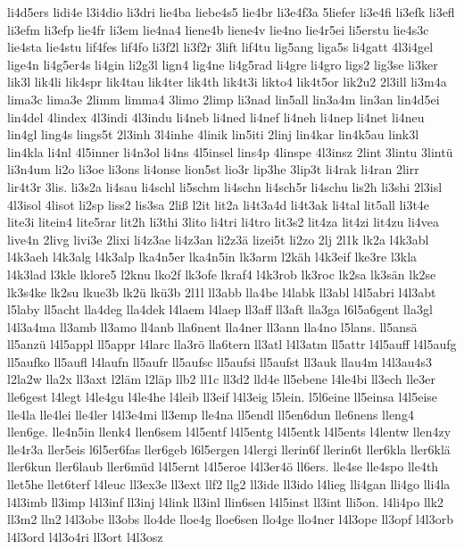 {li4d5ers
lidi4e
l3i4dio
li3dri
lie4ba
liebe4s5
lie4br
li3e4f3a
5liefer
li3e4fi
li3efk
li3efl
li3efm
li3efp
lie4fr
li3em
lie4na4
liene4b
liene4v
lie4no
lie4r5ei
li5erstu
lie4s3c
lie4sta
lie4stu
lif4fes
lif4fo
li3f2l
li3f2r
3lift
lif4tu
lig5ang
liga5s
li4gatt
4l3i4gel
lige4n
li4g5er4s
li4gin
li2g3l
lign4
lig4ne
li4g5rad
li4gre
li4gro
ligs2
lig3se
li3ker
lik3l
lik4li
lik4spr
lik4tau
lik4ter
lik4th
lik4t3i
likto4
lik4t5or
lik2u2
2l3ill
li3m4a
lima3c
lima3e
2limm
limma4
3limo
2limp
li3nad
lin5all
lin3a4m
lin3an
lin4d5ei
lin4del
4lindex
4l3indi
4l3indu
li4neb
li4ned
li4nef
li4neh
li4nep
li4net
li4neu
lin4gl
ling4s
lings5t
2l3inh
3l4inhe
4linik
lin5iti
2linj
lin4kar
lin4k5au
link3l
lin4kla
li4nl
4l5inner
li4n3ol
li4ns
4l5insel
lins4p
4linspe
4l3insz
2lint
3lintu
3lintü
li3n4um
li2o
li3oe
li3ons
li4onse
lion5st
lio3r
lip3he
3lip3t
li4rak
li4ran
2lirr
lir4t3r
3lis.
li3s2a
li4sau
li4schl
li5schm
li4schn
li4sch5r
li4schu
lis2h
li3shi
2l3isl
4l3isol
4lisot
li2sp
liss2
lis3sa
2liß
l2it
lit2a
li4t3a4d
li4t3ak
li4tal
lit5all
li3t4e
lite3i
litein4
lite5rar
lit2h
li3thi
3lito
li4tri
li4tro
lit3s2
lit4za
lit4zi
lit4zu
li4vea
live4n
2livg
livi3e
2lixi
li4z3ae
li4z3an
li2z3ä
lizei5t
li2zo
2lj
2l1k
lk2a
l4k3abl
l4k3aeh
l4k3alg
l4k3alp
lka4n5er
lka4n5in
lk3arm
l2käh
l4k3eif
lke3re
l3kla
l4k3lad
l3kle
lklore5
l2knu
lko2f
lk3ofe
lkraf4
l4k3rob
lk3roc
lk2sa
lk3sän
lk2se
lk3s4ke
lk2su
lkue3b
lk2ü
lkü3b
2l1l
ll3abb
lla4be
l4labk
ll3abl
l4l5abri
l4l3abt
l5laby
ll5acht
lla4deg
lla4dek
l4laem
l4laep
ll3aff
ll3aft
lla3ga
l6l5a6gent
lla3gl
l4l3a4ma
ll3amb
ll3amo
ll4anb
lla6nent
lla4ner
ll3ann
lla4no
l5lans.
ll5ansä
ll5anzü
l4l5appl
ll5appr
l4larc
lla3rö
lla6tern
ll3atl
l4l3atm
ll5attr
l4l5auff
l4l5aufg
ll5aufko
ll5aufl
l4laufn
ll5aufr
ll5aufsc
ll5aufsi
ll5aufst
ll3auk
llau4m
l4l3au4s3
l2la2w
lla2x
ll3axt
l2läm
l2läp
llb2
ll1c
ll3d2
lld4e
ll5ebene
l4le4bi
ll3ech
lle3er
lle6gest
l4legt
l4le4gu
l4le4he
l4leib
ll3eif
l4l3eig
l5lein.
l5l6eine
ll5einsa
l4l5eise
lle4la
lle4lei
lle4ler
l4l3e4mi
ll3emp
lle4na
ll5endl
ll5en6dun
lle6nens
lleng4
llen6ge.
lle4n5in
llenk4
llen6sem
l4l5entf
l4l5entg
l4l5entk
l4l5ents
l4lentw
llen4zy
lle4r3a
ller5eis
l6l5er6fas
ller6geb
l6l5ergen
l4lergi
llerin6f
llerin6t
ller6kla
ller6klä
ller6kun
ller6laub
ller6müd
l4l5ernt
l4l5eroe
l4l3er4ö
ll6ers.
lle4se
lle4spo
lle4th
llet5he
llet6terf
l4leuc
ll3ex3e
ll3ext
llf2
llg2
ll3ide
ll3ido
l4lieg
lli4gan
lli4go
lli4la
l4l3imb
ll3imp
l4l3inf
ll3inj
l4link
ll3inl
llin6sen
l4l5inst
ll3int
lli5on.
l4li4po
llk2
ll3m2
lln2
l4l3obe
ll3obs
llo4de
lloe4g
lloe6sen
llo4ge
llo4ner
l4l3ope
ll3opf
l4l3orb
l4l3ord
l4l3o4ri
ll3ort
l4l3osz
}
